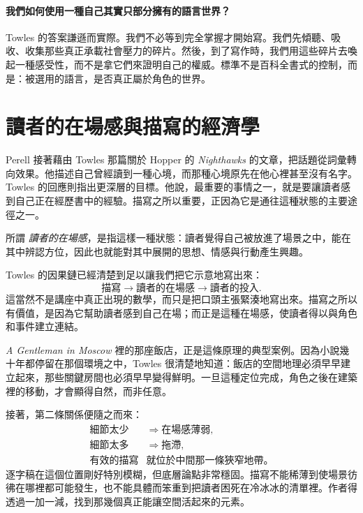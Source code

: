 \paragraph{我們如何使用一種自己其實只部分擁有的語言世界？}

Towles 的答案謙遜而實際。我們不必等到完全掌握才開始寫。我們先傾聽、吸收、收集那些真正承載社會壓力的碎片。然後，到了寫作時，我們用這些碎片去喚起一種感受性，而不是拿它們來證明自己的權威。標準不是百科全書式的控制，而是：被選用的語言，是否真正屬於角色的世界。

\section{讀者的在場感與描寫的經濟學}

Perell 接著藉由 Towles 那篇關於 Hopper 的 \emph{Nighthawks} 的文章，把話題從詞彙轉向效果。他描述自己曾經讀到一種心境，而那種心境原先在他心裡甚至沒有名字。Towles 的回應則指出更深層的目標。他說，最重要的事情之一，就是要讓讀者感到自己正在經歷書中的經驗。描寫之所以重要，正因為它是通往這種狀態的主要途徑之一。

\begin{definition}
所謂 \emph{讀者的在場感}，是指這樣一種狀態：讀者覺得自己被放進了場景之中，能在其中辨認方位，因此也就能對其中展開的思想、情感與行動產生興趣。
\end{definition}

Towles 的因果鏈已經清楚到足以讓我們把它示意地寫出來：
\begin{equation}
\text{描寫} \longrightarrow \text{讀者的在場感} \longrightarrow \text{讀者的投入}.
\end{equation}
這當然不是講座中真正出現的數學，而只是把口頭主張緊湊地寫出來。描寫之所以有價值，是因為它幫助讀者感到自己在場；而正是這種在場感，使讀者得以與角色和事件建立連結。

\emph{A Gentleman in Moscow} 裡的那座飯店，正是這條原理的典型案例。因為小說幾十年都停留在那個環境之中，Towles 很清楚地知道：飯店的空間地理必須早早建立起來，那些關鍵房間也必須早早變得鮮明。一旦這種定位完成，角色之後在建築裡的移動，才會顯得自然，而非任意。

接著，第二條關係便隨之而來：
\begin{align}
\text{細節太少} &\Rightarrow \text{在場感薄弱}, \\
\text{細節太多} &\Rightarrow \text{拖滯}, \\
\text{有效的描寫} &\text{就位於中間那一條狹窄地帶。}
\end{align}
逐字稿在這個位置剛好特別模糊，但底層論點非常穩固。描寫不能稀薄到使場景彷彿在哪裡都可能發生，也不能具體而笨重到把讀者困死在冷冰冰的清單裡。作者得透過一加一減，找到那幾個真正能讓空間活起來的元素。

